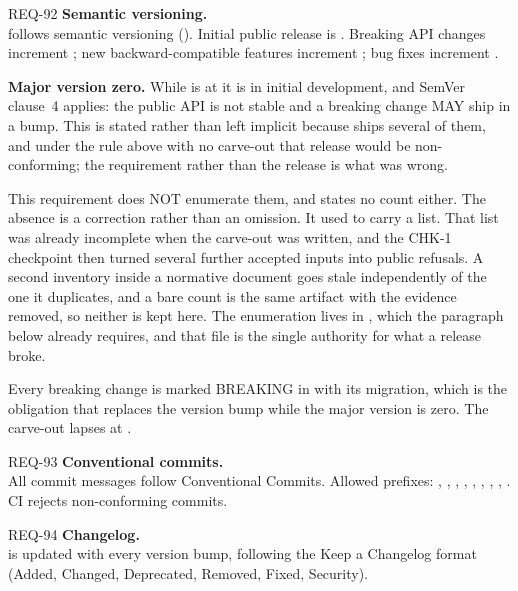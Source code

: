 \begin{reqbox}{REQ-92}{\stable}
\textbf{Semantic versioning.}\\
\itc{} follows semantic versioning (). Initial
public release is . Breaking API changes increment
; new backward-compatible features increment ;
bug fixes increment .

\textbf{Major version zero.} While \itc{} is at  it is in
initial development, and SemVer clause~4 applies: the public API is not
stable and a breaking change MAY ship in a  bump. This is
stated rather than left implicit because  ships several of
them, and under the rule above with no carve-out that release would be
non-conforming; the requirement rather than the release is what was
wrong.

This requirement does NOT enumerate them, and states no count either.
The absence is a correction rather than an omission. It used to carry a
list. That list was already incomplete when the carve-out was written,
and the CHK-1 checkpoint then turned several further accepted inputs
into public refusals. A
second inventory inside a normative document goes stale independently
of the one it duplicates, and a bare count is the same artifact with
the evidence removed, so neither is kept here. The enumeration lives in
, which the paragraph below already requires, and
that file is the single authority for what a release broke.

Every breaking change is marked BREAKING in  with
its migration, which is the obligation that replaces the version bump
while the major version is zero. The carve-out lapses at
.
\end{reqbox}

\begin{reqbox}{REQ-93}{\stable}
\textbf{Conventional commits.}\\
All commit messages follow Conventional Commits. Allowed prefixes:
, , , , ,
, , , . CI rejects
non-conforming commits.
\end{reqbox}

\begin{reqbox}{REQ-94}{\stable}
\textbf{Changelog.}\\
 is updated with every version bump, following the
Keep a Changelog format~\citep{keepachangelog} (Added, Changed,
Deprecated, Removed, Fixed, Security).
\end{reqbox}

